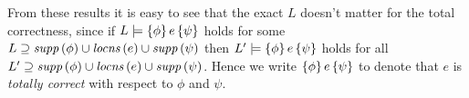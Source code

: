 \documentclass[12pt,a4paper]{report}
\newcommand{\CExp}{\nstyle{CExp}}
\newcommand{\CVal}{\nstyle{CVal}}
\begin{document}
From these results it is easy to see that the exact $L$ doesn't matter for the total correctness, since
if $L\models\{\phi\}\,e\,\{\psi\}$ holds for some $L \supseteq \mathit{supp}\,(\phi)\cup\mathit{locns}\,(e)\cup\mathit{supp}\,(\psi)$
then $L'\models\{\phi\}\,e\,\{\psi\}$ holds for all $L'\supseteq \mathit{supp}\,(\phi)\cup\mathit{locns}\,(e)\cup\mathit{supp}\,(\psi)$.
Hence we write $\{\phi\}\,e\,\{\psi\}$ to denote that $e$ is {\em totally correct} with respect to
$\phi$ and $\psi$.

%
%
%
\end{document}
